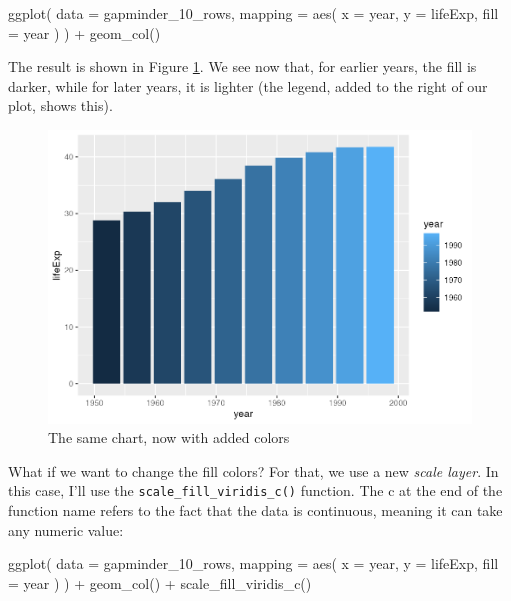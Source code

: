 \documentclass[
]{book}
\newenvironment{Shaded}{\begin{snugshade}}{\end{snugshade}}
\newcommand{\AttributeTok}[1]{\textcolor[rgb]{0.77,0.63,0.00}{#1}}
\newcommand{\FunctionTok}[1]{\textcolor[rgb]{0.00,0.00,0.00}{#1}}
\newcommand{\NormalTok}[1]{#1}
\newcommand{\SpecialCharTok}[1]{\textcolor[rgb]{0.00,0.00,0.00}{#1}}
\begin{document}
\begin{Shaded}
\begin{Highlighting}[]
\FunctionTok{ggplot}\NormalTok{(}
  \AttributeTok{data =}\NormalTok{ gapminder\_10\_rows,}
  \AttributeTok{mapping =} \FunctionTok{aes}\NormalTok{(}
    \AttributeTok{x =}\NormalTok{ year,}
    \AttributeTok{y =}\NormalTok{ lifeExp,}
    \AttributeTok{fill =}\NormalTok{ year}
\NormalTok{  )}
\NormalTok{) }\SpecialCharTok{+}
  \FunctionTok{geom\_col}\NormalTok{()}
\end{Highlighting}
\end{Shaded}

The result is shown in Figure \ref{fig:gapminder-bar-colors-plot}. We see now that, for earlier years, the fill is darker, while for later years, it is lighter (the legend, added to the right of our plot, shows this).

\begin{figure}
\includegraphics[width=1\linewidth]{data-viz_files/figure-latex/gapminder-bar-colors-plot-1} \caption{The same chart, now with added colors}\label{fig:gapminder-bar-colors-plot}
\end{figure}

What if we want to change the fill colors? For that, we use a new \emph{scale layer}. In this case, I'll use the \texttt{scale\_fill\_viridis\_c()} function. The c at the end of the function name refers to the fact that the data is continuous, meaning it can take any numeric value:

\begin{Shaded}
\begin{Highlighting}[]
\FunctionTok{ggplot}\NormalTok{(}
  \AttributeTok{data =}\NormalTok{ gapminder\_10\_rows,}
  \AttributeTok{mapping =} \FunctionTok{aes}\NormalTok{(}
    \AttributeTok{x =}\NormalTok{ year,}
    \AttributeTok{y =}\NormalTok{ lifeExp,}
    \AttributeTok{fill =}\NormalTok{ year}
\NormalTok{  )}
\NormalTok{) }\SpecialCharTok{+}
  \FunctionTok{geom\_col}\NormalTok{() }\SpecialCharTok{+}
  \FunctionTok{scale\_fill\_viridis\_c}\NormalTok{()}
\end{Highlighting}
\end{Shaded}
\end{document}
